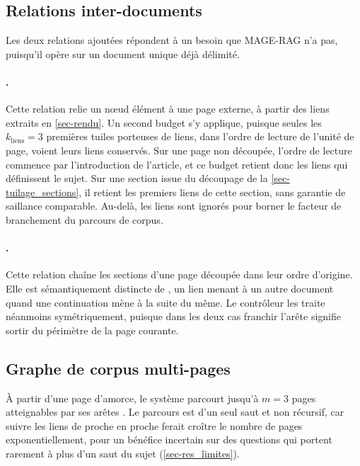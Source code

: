 \subsection{Relations inter-documents}
\label{sec-graphe_interdoc}
 
Les deux relations ajoutées répondent à un besoin que MAGE-RAG n'a pas,
puisqu'il opère sur un document unique déjà délimité.
 
\paragraph{.} Cette relation relie un nœud élément à une page
externe, à partir des liens extraits en \cref{sec-rendu}. Un second budget s'y
applique, puisque seules les $k_{\text{liens}} = 3$ premières tuiles porteuses
de liens, dans l'ordre de lecture de l'unité de page, voient leurs liens
conservés. Sur une page non découpée, l'ordre de lecture commence par
l'introduction de l'article, et ce budget retient donc les liens qui définissent
le sujet. Sur une section issue du découpage de la \cref{sec-tuilage_sections},
il retient les premiers liens de cette section, sans garantie de saillance
comparable. Au-delà, les liens sont ignorés pour borner le facteur de
branchement du parcours de corpus.
 
\paragraph{.} Cette relation chaîne les sections d'une page
découpée dans leur ordre d'origine. Elle est sémantiquement distincte de
, un lien menant à un autre document quand une continuation mène
à la suite du même. Le contrôleur les traite néanmoins symétriquement, puisque
dans les deux cas franchir l'arête signifie sortir du périmètre de la page
courante.
 
\subsection{Graphe de corpus multi-pages}
\label{sec-graphe_corpus}
 
À partir d'une page d'amorce, le système parcourt jusqu'à $m = 3$ pages
atteignables par ses arêtes . Le parcours est d'un seul saut et
non récursif, car suivre les liens de proche en proche ferait croître le nombre
de pages exponentiellement, pour un bénéfice incertain sur des questions qui
portent rarement à plus d'un saut du sujet (\cref{sec-res_limites}).
 
